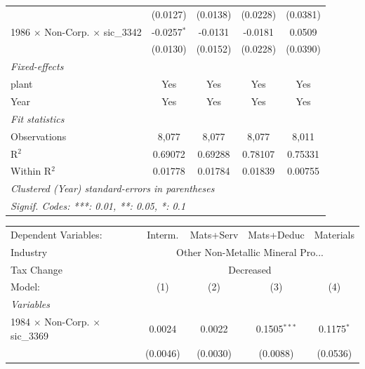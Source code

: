 \documentclass[
  12pt]{article}
\theoremstyle{definition}
\theoremstyle{remark}
\begin{document}
\begin{table}
\begin{minipage}{\linewidth}
\begin{tabular}{lcccc}
                                                 & (0.0127)        & (0.0138)       & (0.0228)   & (0.0381)\\   
   1986 $\times$ Non-Corp. $\times$ sic\_3342    & -0.0257$^{*}$   & -0.0131        & -0.0181    & 0.0509\\   
                                                 & (0.0130)        & (0.0152)       & (0.0228)   & (0.0390)\\   
   \midrule
   \emph{Fixed-effects}\\
   plant                                         & Yes             & Yes            & Yes        & Yes\\  
   Year                                          & Yes             & Yes            & Yes        & Yes\\  
   \midrule
   \emph{Fit statistics}\\
   Observations                                  & 8,077           & 8,077          & 8,077      & 8,011\\  
   R$^2$                                         & 0.69072         & 0.69288        & 0.78107    & 0.75331\\  
   Within R$^2$                                  & 0.01778         & 0.01784        & 0.01839    & 0.00755\\  
   \midrule \midrule
   \multicolumn{5}{l}{\emph{Clustered (Year) standard-errors in parentheses}}\\
   \multicolumn{5}{l}{\emph{Signif. Codes: ***: 0.01, **: 0.05, *: 0.1}}\\
\end{tabular}
\par\endgroup
\begingroup
\centering
\begin{tabular}{lcccc}
   \tabularnewline \midrule \midrule
   Dependent Variables:                          & Interm.        & Mats+Serv      & Mats+Deduc     & Materials\\  
   Industry & \multicolumn{4}{c}{Other Non-Metallic Mineral Pro...} \\ 
   Tax Change & \multicolumn{4}{c}{Decreased} \\ 
   Model:                                        & (1)            & (2)            & (3)            & (4)\\  
   \midrule
   \emph{Variables}\\
   1984 $\times$ Non-Corp. $\times$ sic\_3369    & 0.0024         & 0.0022         & 0.1505$^{***}$ & 0.1175$^{*}$\\   
                                                 & (0.0046)       & (0.0030)       & (0.0088)       & (0.0536)\\   

\end{tabular}
\end{minipage}
\end{table}
\end{document}

